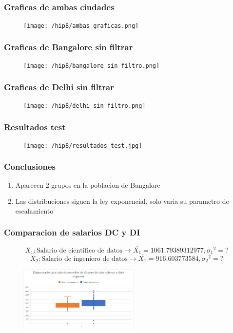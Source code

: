 \documentclass{beamer}
\begin{document}
\begin{frame}
  \frametitle{Graficas de ambas ciudades}
  \begin{figure}[t]
      \texttt{[image: /hip8/ambas\_graficas.png]}
  \end{figure}

\end{frame}

\begin{frame}
  \frametitle{Graficas de Bangalore sin filtrar}
  \begin{figure}[t]
      \texttt{[image: /hip8/bangalore\_sin\_filtro.png]}
  \end{figure}

\end{frame}

\begin{frame}
  \frametitle{Graficas de Delhi sin filtrar}
  \begin{figure}[t]
      \texttt{[image: /hip8/delhi\_sin\_filtro.png]}
  \end{figure}
\end{frame}

\begin{frame}
  \frametitle{Resultados test}
  \begin{figure}[t]
      \texttt{[image: /hip8/resultados\_test.jpg]}
  \end{figure}
\end{frame}

\begin{frame}
  \frametitle{Conclusiones}
  \begin{enumerate}
   \item Aparecen 2 grupos en la poblacion de Bangalore
   \item Las distribuciones siguen la ley exponencial, solo
     varia su parametro de escalamiento
  \end{enumerate}
\end{frame}


\begin{frame}
  \frametitle{Comparacion de salarios DC y DI}
  \[{X_1}: \textrm{Salario de cientifico de datos} \rightarrow \overline{X_1} = 1061.79389312977, {\sigma_1}^2 = ?\]
  \[{X_2}: \textrm{Salario de ingeniero de datos} \rightarrow \overline{X_1} = 916.603773584, {\sigma_2}^2 = ?\]
\begin{figure}[t]
  \includegraphics[width=6cm]{cajas1.jpeg}
\end{figure}
\end{frame}
\end{document}
